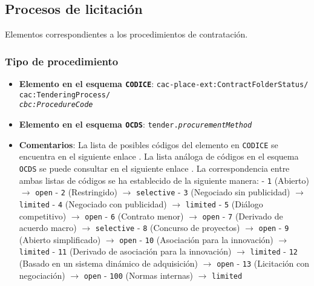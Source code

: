     \vspace{0.3cm}

    \subsection{Procesos de licitación}
    
        Elementos correspondientes a los procedimientos de contratación.
    
        \subsubsection{Tipo de procedimiento}
            \begin{itemize}
                \item \textbf{Elemento en el esquema \texttt{CODICE}}:
                    \tabto{7.6cm} \texttt{cac-place-ext:ContractFolderStatus/} \\
                    \tabto{7.6cm} \texttt{cac:TenderingProcess/} \\
                    \tabto{7.6cm} \texttt{\textit{cbc:ProcedureCode}}
                \item \textbf{Elemento en el esquema \texttt{OCDS}}:
                    \tabto{7.6cm} \texttt{tender.\textit{procurementMethod}}
                \item \textbf{Comentarios}: La lista de posibles códigos del elemento en \texttt{CODICE} se encuentra en el siguiente enlace \cite{CR8}.
                    La lista análoga de códigos en el esquema \texttt{OCDS} se puede consultar en el siguiente enlace \cite{CR9}.
                    La correspondencia entre ambas listas de códigos se ha establecido de la siguiente manera:
                        \subitem - \texttt{1} (Abierto) $\rightarrow$ \texttt{open}
                        \subitem - \texttt{2} (Restringido) $\rightarrow$ \texttt{selective}
                        \subitem - \texttt{3} (Negociado sin publicidad) $\rightarrow$ \texttt{limited}
                        \subitem - \texttt{4} (Negociado con publicidad) $\rightarrow$ \texttt{limited}
                        \subitem - \texttt{5} (Diálogo competitivo) $\rightarrow$ \texttt{open}
                        \subitem - \texttt{6} (Contrato menor) $\rightarrow$ \texttt{open}
                        \subitem - \texttt{7} (Derivado de acuerdo macro) $\rightarrow$ \texttt{selective}
                        \subitem - \texttt{8} (Concurso de proyectos) $\rightarrow$ \texttt{open}
                        \subitem - \texttt{9} (Abierto simplificado) $\rightarrow$ \texttt{open}
                        \subitem - \texttt{10} (Asociación para la innovación) $\rightarrow$ \texttt{limited}
                        \subitem - \texttt{11} (Derivado de asociación para la innovación) $\rightarrow$ \texttt{limited}
                        \subitem - \texttt{12} (Basado en un sistema dinámico de adquisición) $\rightarrow$ \texttt{open}
                        \subitem - \texttt{13} (Licitación con negociación) $\rightarrow$ \texttt{open}
                        \subitem - \texttt{100} (Normas internas) $\rightarrow$ \texttt{limited}
            \end{itemize}
        
